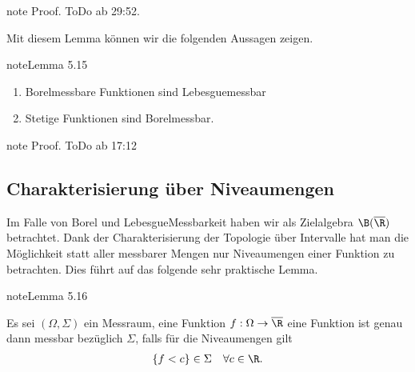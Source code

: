 \documentclass[letterpaper,10pt,german]{jupyterBook}
\begin{document}
\begin{sphinxadmonition}{note}
\sphinxAtStartPar
Proof. ToDo
 ab 29:52.
\end{sphinxadmonition}

\sphinxAtStartPar
Mit diesem Lemma können wir die folgenden Aussagen zeigen.
\label{masstheorie/lebesgue_integral:lemma-3}
\begin{sphinxadmonition}{note}{Lemma 5.15}


\begin{enumerate}
%
\item {} 
\sphinxAtStartPar
Borel\sphinxhyphen{}messbare Funktionen sind Lebesgue\sphinxhyphen{}messbar

\item {} 
\sphinxAtStartPar
Stetige Funktionen sind Borel\sphinxhyphen{}messbar.

\end{enumerate}
\end{sphinxadmonition}

\begin{sphinxadmonition}{note}
\sphinxAtStartPar
Proof. ToDo
 ab 17:12
\end{sphinxadmonition}


\subsection{Charakterisierung über Niveaumengen}
\label{\detokenize{masstheorie/lebesgue_integral:charakterisierung-uber-niveaumengen}}
\sphinxAtStartPar
Im Falle von Borel und Lebesgue\sphinxhyphen{}Messbarkeit haben wir als Zielalgebra \(\B(\overline{\R})\) betrachtet. Dank der Charakterisierung der Topologie über Intervalle hat man die Möglichkeit statt aller messbarer Mengen nur Niveaumengen einer Funktion zu betrachten. Dies führt auf das folgende sehr praktische Lemma.
\label{masstheorie/lebesgue_integral:lem:Niveaumengen}
\begin{sphinxadmonition}{note}{Lemma 5.16}



\sphinxAtStartPar
Es sei \((\Omega,\Sigma)\) ein Messraum, eine Funktion \(f:\Omega\to\overline{\R}\) eine Funktion ist genau dann messbar bezüglich \(\Sigma\), falls
für die Niveaumengen gilt
\begin{equation*}
\begin{split}\{f< c\}\in\Sigma\quad\forall c\in\R.\end{split}
\end{equation*}\end{sphinxadmonition}
\end{document}
